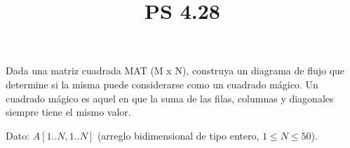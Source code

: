 \documentclass[11pt]{amsart}
\title{PS 4.28}
\begin{document}
\maketitle
 \noindent Dada una matriz cuadrada MAT (M x N), construya un diagrama de flujo que determine si la misma puede considerarse como un cuadrado mágico. Un cuadrado mágico es aquel en que la suma de las filas, columnas y diagonales siempre tiene el mismo valor. \newline

 \noindent Dato: $A[1..N, 1..N]$ (arreglo bidimensional de tipo entero, $1 \leq N \leq 50$). 
\end{document}
